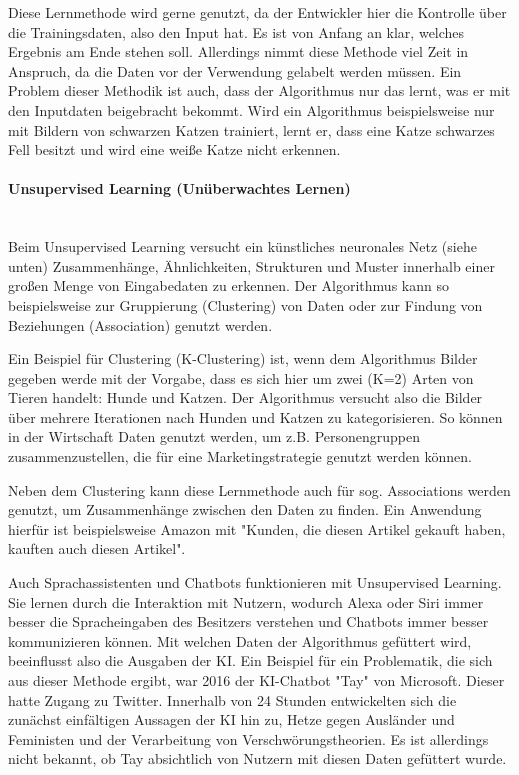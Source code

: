 \documentclass[a4paper,12pt, german]{report}
\begin{document}
Diese Lernmethode wird gerne genutzt, da der Entwickler hier die Kontrolle über die Trainingsdaten, also den Input hat. Es ist von Anfang an klar, welches Ergebnis am Ende stehen soll. Allerdings nimmt diese Methode viel Zeit in Anspruch, da die Daten vor der Verwendung gelabelt werden müssen. Ein Problem dieser Methodik ist auch, dass der Algorithmus nur das lernt, was er mit den Inputdaten beigebracht bekommt. Wird ein Algorithmus beispielsweise nur mit Bildern von schwarzen Katzen trainiert, lernt er, dass eine Katze schwarzes Fell besitzt und wird eine weiße Katze nicht erkennen.

\paragraph{Unsupervised Learning (Unüberwachtes Lernen)} $  $ \\ Beim Unsupervised Learning versucht ein künstliches neuronales Netz (siehe unten) Zusammenhänge, Ähnlichkeiten, Strukturen und Muster innerhalb einer großen Menge von Eingabedaten zu erkennen. Der Algorithmus kann so beispielsweise zur Gruppierung (Clustering) von Daten oder zur Findung von Beziehungen (Association) genutzt werden.\cite{01}

Ein Beispiel für Clustering (K-Clustering) ist, wenn dem Algorithmus Bilder gegeben werde mit der Vorgabe, dass es sich hier um zwei (K=2) Arten von Tieren handelt: Hunde und Katzen. Der Algorithmus versucht also die Bilder über mehrere Iterationen nach Hunden und Katzen zu kategorisieren. So können in der Wirtschaft Daten genutzt werden, um z.B. Personengruppen zusammenzustellen, die für eine Marketingstrategie genutzt werden können.

Neben dem Clustering kann diese Lernmethode auch für sog. Associations werden genutzt, um Zusammenhänge zwischen den Daten zu finden. Ein Anwendung hierfür ist beispielsweise Amazon mit "Kunden, die diesen Artikel gekauft haben, kauften auch diesen Artikel".

Auch Sprachassistenten und Chatbots funktionieren mit Unsupervised Learning. Sie lernen durch die Interaktion mit Nutzern, wodurch Alexa oder Siri immer besser die Spracheingaben des Besitzers verstehen und Chatbots immer besser kommunizieren können. Mit welchen Daten der Algorithmus gefüttert wird, beeinflusst also die Ausgaben der KI. Ein Beispiel für ein Problematik, die sich aus dieser Methode ergibt, war 2016 der KI-Chatbot "Tay" von Microsoft. Dieser hatte Zugang zu Twitter. Innerhalb von 24 Stunden entwickelten sich die zunächst einfältigen Aussagen der KI hin zu, Hetze gegen Ausländer und Feministen und der Verarbeitung von Verschwörungstheorien. Es ist allerdings nicht bekannt, ob Tay absichtlich von Nutzern mit diesen Daten gefüttert wurde. 
\end{document}
